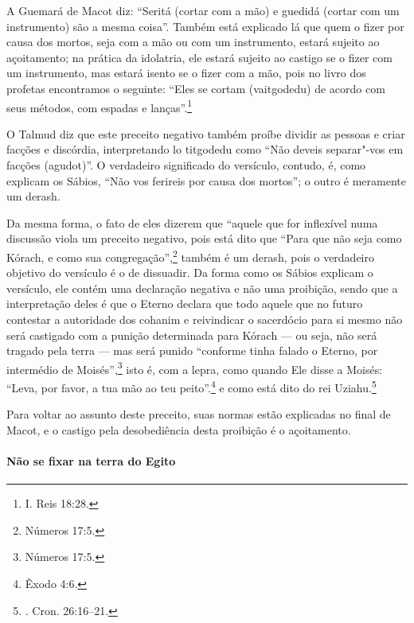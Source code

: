 \begin{multicols}{2}
A Guemará\starr{} de Macot\starr{} diz: ``Seritá\starr{} (cortar com a mão) e guedidá\starr{}
(cortar com um instrumento) são a mesma coisa''. Também está explicado
lá que quem o fizer por causa dos mortos, seja com a mão ou com um
instrumento, estará sujeito ao açoitamento; na prática da idolatria,
ele estará sujeito ao castigo se o fizer com um instrumento, mas estará
isento se o fizer com a mão, pois no livro dos profetas encontramos o
seguinte: ``Eles se cortam (vaitgodedu\starr) de acordo com seus métodos,
com espadas e lanças''.\footnote{I. Reis 18:28.}

O Talmud\starr{} diz que este preceito negativo também proíbe dividir as pessoas
e criar facções e discórdia, interpretando lo titgodedu\starr{} como ``Não
deveis separar"-vos em facções (agudot\starr)''. O verdadeiro significado do
versículo, contudo, é, como explicam os Sábios, ``Não vos ferireis por
causa dos mortos''; o outro é meramente um derash\starr.

Da mesma forma, o fato de eles dizerem que ``aquele que for inflexível
numa discussão viola um preceito negativo, pois está dito que ``Para que
não seja como Kórach\starr, e como sua congregação'',\footnote{Números 17:5.} também é
um derash\starr, pois o verdadeiro objetivo do versículo é o de dissuadir.
Da forma como os Sábios explicam o versículo, ele contém uma declaração
negativa e não uma proibição, sendo que a interpretação deles é que o
Eterno declara que todo aquele que no futuro contestar a autoridade dos
cohanim\starr{} e reivindicar o sacerdócio para si mesmo não será castigado
com a punição determinada para Kórach\starr{} --- ou seja, não será tragado pela
terra --- mas será punido ``conforme tinha falado o Eterno, por
intermédio de Moisés'',\footnote{Números 17:5.} isto é, com a lepra, como quando
Ele disse a Moisés: ``Leva, por favor, a tua mão ao teu peito''.\footnote{Êxodo
4:6.} e como está dito do rei Uziahu\starr.\footnote{. Cron. 26:16--21.}

Para voltar ao assunto deste preceito, suas normas estão explicadas no
final de Macot\starr, e o castigo pela desobediência desta proibição é o
açoitamento.

\paragraph{Não se fixar na terra do Egito}


\end{multicols}

